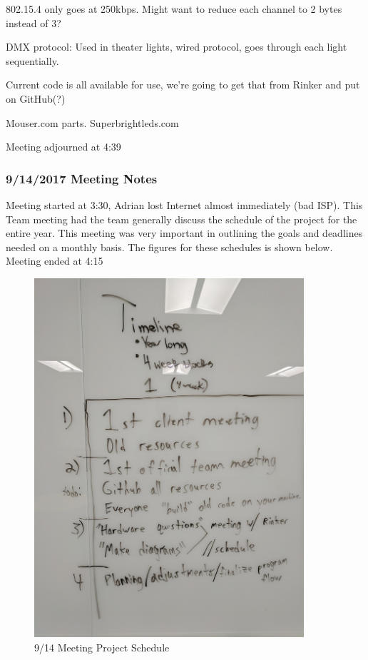\documentclass[12pt]{article}
\begin{document}
802.15.4 only goes at 250kbps. Might want to reduce each channel to 2 bytes instead of 3?

DMX protocol: Used in theater lights, wired protocol, goes through each light sequentially.

Current code is all available for use, we're going to get that from Rinker and put on GitHub(?)

Mouser.com parts. Superbrightleds.com	

Meeting adjourned at 4:39
	
	\subsubsection{9/14/2017 Meeting Notes}
	Meeting started at 3:30, Adrian lost Internet almost immediately (bad ISP). This Team meeting had the team generally discuss the schedule of the project for the entire year. This meeting was very important in outlining the goals and deadlines needed on a monthly basis. The figures for these schedules is shown below. Meeting ended at 4:15
	
	\begin{figure}[!htb]
		\centering
		\includegraphics[width=100mm]{assets/9-14_Project_Agenda_1.jpg}
		\caption{9/14 Meeting Project Schedule \label{overflow}}
	\end{figure}
\end{document}
